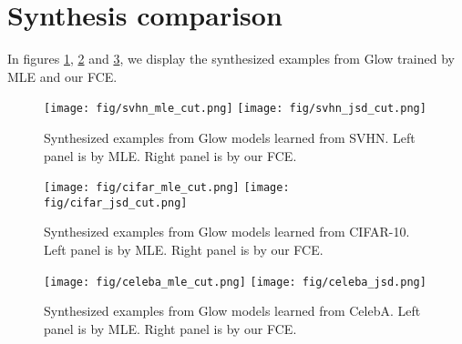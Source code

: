 \documentclass[10pt,twocolumn,letterpaper]{article}
\begin{document}
\section{Synthesis comparison}
In figures \ref{fig: svhn_compare}, \ref{fig: cifar_compare} and \ref{fig: celeba_compare}, we display the synthesized examples from Glow trained by MLE and our FCE.  

\begin{figure}[h]
\centering
	\texttt{[image: fig/svhn\_mle\_cut.png]}
	\hspace{0.1cm}
	\texttt{[image: fig/svhn\_jsd\_cut.png]}
	\caption{Synthesized examples from Glow models learned from SVHN. Left panel is by MLE. Right panel is by our FCE. }
	\label{fig: svhn_compare}
\end{figure}

\begin{figure}[h]
\centering
	\texttt{[image: fig/cifar\_mle\_cut.png]}
	\hspace{0.1cm}
	\texttt{[image: fig/cifar\_jsd\_cut.png]}
	\caption{Synthesized examples from Glow models learned from CIFAR-10. Left panel is by MLE. Right panel is by our FCE. }
	\label{fig: cifar_compare}
\end{figure}


\begin{figure}[h]
\centering
	\texttt{[image: fig/celeba\_mle\_cut.png]}
	\hspace{0.1cm}
	\texttt{[image: fig/celeba\_jsd.png]}
	\caption{Synthesized examples from Glow models learned from CelebA. Left panel is by MLE. Right panel is by our FCE. }
	\label{fig: celeba_compare}
\end{figure}
\end{document}
